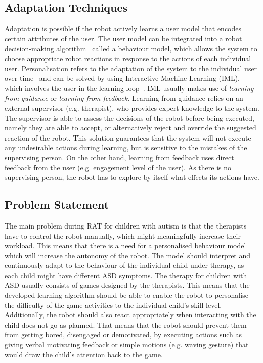 \documentclass[thesis]{mas_proposal}
\begin{document}
\subsection{Adaptation Techniques}
Adaptation is possible if the robot actively learns a user model that encodes certain attributes of the user. The user model can be integrated into a robot decision-making algorithm~\cite{rossi2017user} called a behaviour model, which allows the system to choose appropriate robot reactions in response to the actions of each individual user. Personalisation refers to the adaptation of the system to the individual user over time~\cite{rossi2017user} and can be solved by using Interactive Machine Learning (IML), which involves the user in the learning loop~\cite{senft2019teaching}. IML usually makes use of \emph{learning from guidance} or \emph{learning from feedback}. Learning from guidance relies on an external supervisor (e.g. therapist), who provides expert knowledge to the system. The supervisor is able to assess the decisions of the robot before being executed, namely they are able to accept, or alternatively reject and override the suggested reaction of the robot. This solution guarantees that the system will not execute any undesirable actions during learning, but is sensitive to the mistakes of the supervising person. On the other hand, learning from feedback uses direct feedback from the user (e.g. engagement level of the user). As there is no supervising person, the robot has to explore by itself what effects its actions have. 

\subsection{Problem Statement}
The main problem during RAT for children with autism is that the therapists have to control the robot manually, which might meaningfully increase their workload. This means that there is a need for a personalised behaviour model which will increase the autonomy of the robot. The model should interpret and continuously adapt to the behaviour of the individual child under therapy, as each child might have different ASD symptoms. The therapy for children with ASD usually consists of games designed by the therapists. This means that the developed learning algorithm should be able to enable the robot to personalise the difficulty of the game activities to the individual child's skill level. Additionally, the robot should also react appropriately when interacting with the child does not go as planned. That means that the robot should prevent them from getting bored, disengaged or demotivated, by executing actions such as giving verbal motivating feedback or simple motions (e.g. waving gesture) that would draw the child’s attention back to the game.
\end{document}
